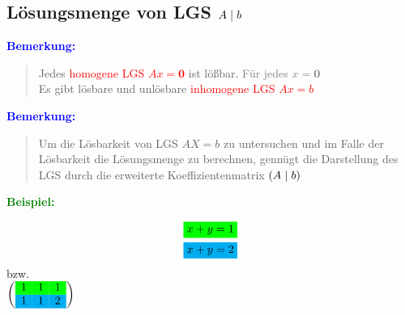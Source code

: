 \documentclass{article}
\newcommand{\mesk}{\vspace{10px}}
\newcommand{\smsp}{\phantom{\hspace{3px}}}
\newcommand{\red}[1]{\textcolor{red}{#1}}
\newcommand{\gray}[1]{\textcolor{gray}{#1}}
\newcommand{\blue}[1]{\textcolor{blue}{#1}}
\newcommand{\green}[1]{\textcolor{green}{#1}}
\newcommand{\hcyan}[1]{\colorbox{cyan}{#1}}
\newcommand{\hgreen}[1]{\colorbox{green}{#1}}
\newcommand{\ex}{\green{\textbf{Beispiel: }}}
\newcommand{\an}[1]{\blue{\textbf{Bemerkung: }}\begin{quote}#1\end{quote}}
\renewcommand{\st}{\smsp | \smsp}
\begin{document}
\subsection{\texorpdfstring{Lösungsmenge von LGS $A \st b$}{Lösungsmenge von LGS (A | b)}}
\an{
    Jedes \red{homogene LGS $Ax = \mathbf{0}$} ist lößbar. \gray{Für jedes $x = \mathbf{0}$}\\
    Es gibt lösbare und unlösbare \red{inhomogene LGS $Ax = b$}
}

\an{
    Um die Lösbarkeit von LGS $AX = b$ zu untersuchen und im Falle der Lösbarkeit die Lösungsmenge zu berechnen, gennügt die Darstellung des LGS durch die erweiterte Koeffizientenmatrix $(A \st b)$
}

\ex
\begin{center}
    \begin{minipage}{3.9cm}
        \begin{center}
            \begin{equation*}
                \begin{split}
                    \hgreen{$x + y = 1$}\\
                    \hcyan{$x + y = 2$}
                \end{split}
            \end{equation*}
            bzw.\\
            \mesk
            $\left(
                \begin{array}{ccc}
                    \rowcolor{green}
                    1 & 1 & 1\\
                    \rowcolor{cyan}
                    1 & 1 & 2
                \end{array}
            \right)$\\
            \mesk


\end{center}
\end{minipage}
\end{center}
\end{document}
